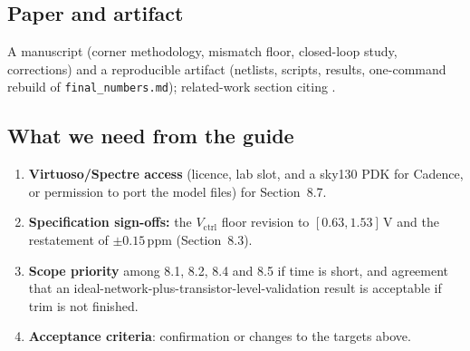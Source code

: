 \documentclass[11pt,a4paper]{article}
\newcommand{\vc}{V_{\mathrm{ctrl}}}
\begin{document}
\subsection{Paper and artifact}
A manuscript (corner methodology, mismatch floor, closed-loop study, corrections) and a reproducible artifact (netlists, scripts, results, one-command rebuild of \texttt{final\_numbers.md}); related-work section citing \cite{ortner17,souliotis22,freitas25,thiri26}.

\subsection{What we need from the guide}
\begin{enumerate}[nosep]
\item \textbf{Virtuoso/Spectre access} (licence, lab slot, and a sky130 PDK for Cadence, or permission to port the model files) for Section~8.7.
\item \textbf{Specification sign-offs:} the $\vc$ floor revision to $[0.63,1.53]$\,V and the restatement of $\pm0.15$\,ppm (Section~8.3).
\item \textbf{Scope priority} among 8.1, 8.2, 8.4 and 8.5 if time is short, and agreement that an ideal-network-plus-transistor-level-validation result is acceptable if trim is not finished.
\item \textbf{Acceptance criteria}: confirmation or changes to the targets above.
\end{enumerate}
\end{document}
